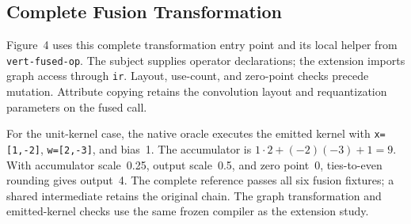 \clearpage
\subsection{Complete Fusion Transformation}
\label{sec:fusion-code}

Figure~4 uses this complete transformation entry point and its local helper
from \texttt{vert-fused-op}. The subject supplies operator declarations;
the extension imports graph access through \texttt{ir}. Layout, use-count,
and zero-point checks precede mutation. Attribute copying retains the
convolution layout and requantization parameters on the fused call.



For the unit-kernel case, the native oracle executes the emitted kernel with
\texttt{x=[1,-2]}, \texttt{w=[2,-3]}, and bias~1. The accumulator is
$1\cdot2+(-2)(-3)+1=9$. With accumulator scale~0.25, output scale~0.5,
and zero point~0, ties-to-even rounding gives output~4. The complete reference
passes all six fusion fixtures; a shared intermediate retains the original
chain. The graph transformation and emitted-kernel checks use the same frozen
compiler as the extension study.
